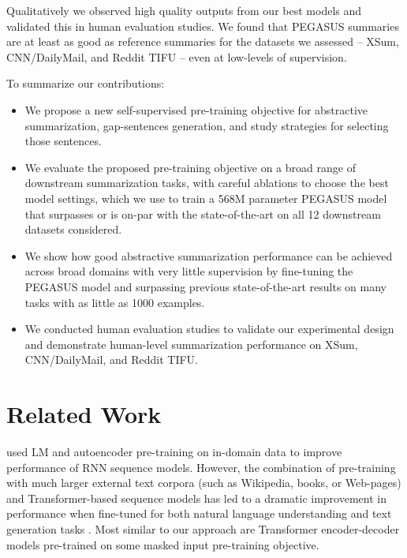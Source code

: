 \documentclass{article}
\newcommand\largemodelsize{568M\xspace}
\begin{document}
Qualitatively we observed high quality outputs from our best models
and validated this in human evaluation studies. We found that PEGASUS
summaries are at least as good as reference summaries for the datasets
we assessed -- XSum, CNN/DailyMail, and Reddit TIFU -- even at low-levels
of supervision.

To summarize our contributions:
\begin{itemize}
    \item 
    We propose a new self-supervised pre-training objective for abstractive summarization, gap-sentences generation, and study strategies for selecting
    those sentences.
    \item We evaluate the proposed pre-training objective on a broad range of downstream summarization tasks, with careful
    ablations to choose the best model settings, which we use to train a \largemodelsize parameter PEGASUS model that surpasses or is on-par with the state-of-the-art on all 12 downstream datasets considered.
    
    \item We show how good abstractive summarization performance can be achieved
    across broad domains with very little supervision by fine-tuning
    the PEGASUS model and surpassing previous state-of-the-art results on many tasks with
    as little as 1000 examples.
    
    \item We conducted human evaluation studies to validate our
    experimental design and demonstrate
    human-level summarization performance on XSum, CNN/DailyMail, and Reddit TIFU.
\end{itemize}





\section{Related Work}
\label{sec:related_works}

\citet{dai_2015, ramachandran-etal-2017-unsupervised} used
LM and autoencoder pre-training on in-domain data to improve performance
of RNN sequence models.
However, the combination of pre-training with much larger
external text corpora (such as Wikipedia, books, or Web-pages) and Transformer-based sequence models
has led to a dramatic improvement in performance when
fine-tuned for
both natural language understanding and text generation tasks \citep{radford2018improving,devlin_2019,rothe2019leveraging,yang2019xlnet,joshi2019spanbert,song2019mass,unilm,lewis2019bart}.
Most similar to our approach are Transformer encoder-decoder models pre-trained on some masked input pre-training objective.
\end{document}
